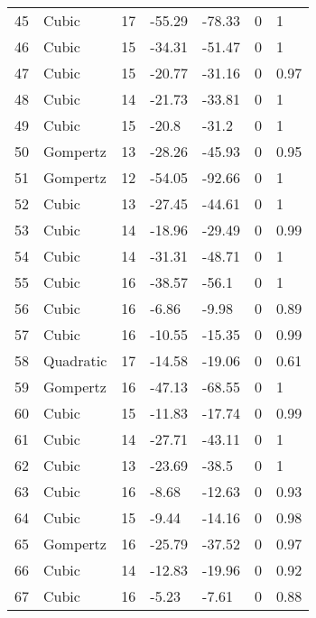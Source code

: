 \documentclass[11pt]{article}
\begin{document}
\begin{center}
\begin{longtable}{lllllll}
    45  & Cubic     & 17              & -55.29  & -78.33  & 0       & 1    \\
    46  & Cubic     & 15              & -34.31  & -51.47  & 0       & 1    \\
    47  & Cubic     & 15              & -20.77  & -31.16  & 0       & 0.97 \\
    48  & Cubic     & 14              & -21.73  & -33.81  & 0       & 1    \\
    49  & Cubic     & 15              & -20.8   & -31.2   & 0       & 1    \\
    50  & Gompertz  & 13              & -28.26  & -45.93  & 0       & 0.95 \\
    51  & Gompertz  & 12              & -54.05  & -92.66  & 0       & 1    \\
    52  & Cubic     & 13              & -27.45  & -44.61  & 0       & 1    \\
    53  & Cubic     & 14              & -18.96  & -29.49  & 0       & 0.99 \\
    54  & Cubic     & 14              & -31.31  & -48.71  & 0       & 1    \\
    55  & Cubic     & 16              & -38.57  & -56.1   & 0       & 1    \\
    56  & Cubic     & 16              & -6.86   & -9.98   & 0       & 0.89 \\
    57  & Cubic     & 16              & -10.55  & -15.35  & 0       & 0.99 \\
    58  & Quadratic & 17              & -14.58  & -19.06  & 0       & 0.61 \\
    59  & Gompertz  & 16              & -47.13  & -68.55  & 0       & 1    \\
    60  & Cubic     & 15              & -11.83  & -17.74  & 0       & 0.99 \\
    61  & Cubic     & 14              & -27.71  & -43.11  & 0       & 1    \\
    62  & Cubic     & 13              & -23.69  & -38.5   & 0       & 1    \\
    63  & Cubic     & 16              & -8.68   & -12.63  & 0       & 0.93 \\
    64  & Cubic     & 15              & -9.44   & -14.16  & 0       & 0.98 \\
    65  & Gompertz  & 16              & -25.79  & -37.52  & 0       & 0.97 \\
    66  & Cubic     & 14              & -12.83  & -19.96  & 0       & 0.92 \\
    67  & Cubic     & 16              & -5.23   & -7.61   & 0       & 0.88 \\

\end{longtable}
\end{center}
\end{document}
